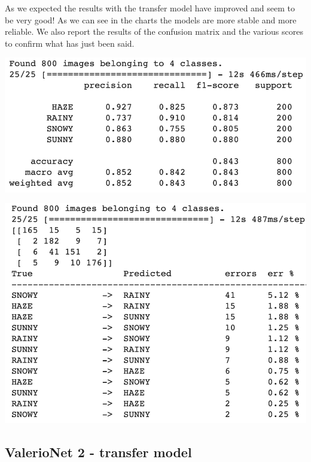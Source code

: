 \documentclass[12pt]{article}
\begin{document}
As we expected the results with the transfer model have improved and seem to be very good! As we can see in the charts the models are more stable and more reliable. We also report the results of the confusion matrix and the various scores to confirm what has just been said. \newline
\begin{minipage}[c]{.5\textwidth}
 \centering
 \includegraphics[width=\textwidth]{pic6}
\end{minipage}
\hspace{1em}
\begin{minipage}[c]{.5\textwidth}
 \centering
 \includegraphics[width=\textwidth]{pic7}
\end{minipage}

\subsection{ValerioNet 2 - transfer model}
\end{document}
